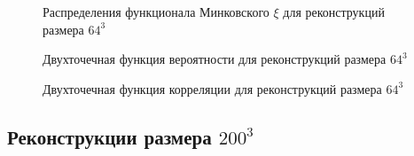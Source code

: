 			\begin{figure}[h]
				\begin{minipage}[h]{0.49\linewidth}
				\end{minipage}
				\hfill
				\begin{minipage}[h]{0.49\linewidth}
				\end{minipage}
				\caption{Распределения функционала Минковского $\xi$ для реконструкций размера $64^3$}
				\label{5-dist-Xi-64}
			\end{figure}
		
			\begin{figure}[h]
				\begin{minipage}[h]{0.49\linewidth}
				\end{minipage}
				\hfill
				\begin{minipage}[h]{0.49\linewidth}
				\end{minipage}
				\caption{Двухточечная функция вероятности для реконструкций размера $64^3$}
				\label{5-prob-64}
			\end{figure}
		
			\begin{figure}[h]
				\begin{minipage}[h]{0.49\linewidth}
				\end{minipage}
				\hfill
				\begin{minipage}[h]{0.49\linewidth}
				\end{minipage}
				\caption{Двухточечная функция корреляции для реконструкций размера $64^3$}
				\label{5-corr-64}
			\end{figure}
	
	\subsection{Реконструкции размера $200^3$}
